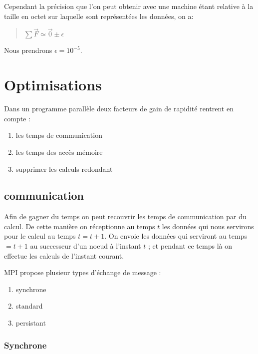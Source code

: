 \par Cependant la précision que l'on peut obtenir avec une machine étant relative à 
la taille en octet sur laquelle sont représentées les données, on a:
\begin{quote}
  \begin{center}
    $\sum \overrightarrow{F} \simeq \overrightarrow{0} \pm \epsilon$
  \end{center}
\end{quote}
Nous prendrons $\epsilon = 10^{-5}$.

\section{Optimisations}

\par Dans un programme parallèle deux facteurs de gain de rapidité rentrent en compte : 
\begin{enumerate}
\item les temps de communication 
\item les temps des accès mémoire
\item supprimer les calculs redondant
\end{enumerate}

\subsection{communication}

\par Afin de gagner du temps on peut recouvrir les temps de communication par du calcul. De
cette manière on réceptionne au temps $t$ les données qui nous servirons pour le
calcul au temps $t=t+1$. On envoie les données qui serviront au temps $=t+1$
au successeur d'un noeud à l'instant $t$ ; et pendant ce temps là on effectue les calculs 
de l'instant courant.\\

\par MPI propose plusieur types d'échange de message :\\
\begin{enumerate}
\item synchrone
\item standard
\item persistant
\end{enumerate}

\subsubsection{Synchrone}

